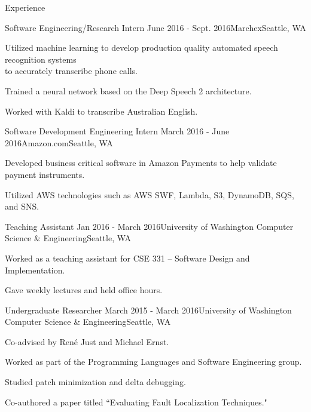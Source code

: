 \documentclass{resume} %
\begin{document}
\begin{rSection}{Experience}

  \begin{rSubsection}{Software Engineering/Research Intern}
    {June 2016 - Sept. 2016}{Marchex}{Seattle, WA}
  \item Utilized machine learning to develop production quality automated speech recognition systems \\ to accurately transcribe phone calls.
  \item Trained a neural network based on the Deep Speech 2 architecture.
  \item Worked with Kaldi to transcribe Australian English.
  \end{rSubsection}

  \begin{rSubsection}{Software Development Engineering Intern}
    {March 2016 - June 2016}{Amazon.com}{Seattle, WA}
  \item Developed business critical software in Amazon Payments to help validate payment instruments.
  \item Utilized AWS technologies such as AWS SWF, Lambda, S3, DynamoDB, SQS, and SNS.
  \end{rSubsection}

  \begin{rSubsection}{Teaching Assistant}
    {Jan 2016 - March 2016}{University of Washington Computer Science \& Engineering}{Seattle, WA}
  \item Worked as a teaching assistant for CSE 331 -- Software Design and Implementation.
  \item Gave weekly lectures and held office hours.
  \end{rSubsection}

  \begin{rSubsection}{Undergraduate Researcher}
    {March 2015 - March 2016}{University of Washington Computer Science \& Engineering}{Seattle, WA}
  \item Co-advised by Ren{\'e} Just and Michael Ernst.
  \item Worked as part of the Programming Languages and Software Engineering group.
  \item Studied patch minimization and delta debugging.
  \item Co-authored a paper titled ``Evaluating Fault Localization Techniques."

  \end{rSubsection}

\end{rSection}
\end{document}
